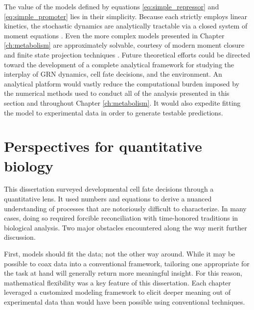 The value of the models defined by equations \ref{eq:simple_repressor} and \ref{eq:simple_promoter} lies in their simplicity. Because each strictly employs linear kinetics, the stochastic dynamics are analytically tractable via a closed system of moment equations \cite{Sotiropoulos2011}. Even the more complex models presented in Chapter \ref{ch:metabolism} are approximately solvable, courtesy of modern moment closure and finite state projection techniques \cite{Singh2011,Munsky2006}. Future theoretical efforts could be directed toward the development of a complete analytical framework for studying the interplay of GRN dynamics, cell fate decisions, and the environment. An analytical platform would vastly reduce the computational burden imposed by the numerical methods used to conduct all of the analysis presented in this section and throughout Chapter \ref{ch:metabolism}. It would also expedite fitting the model to experimental data in order to generate testable predictions. 

\section{Perspectives for quantitative biology}

This dissertation surveyed developmental cell fate decisions through a quantitative lens. It used numbers and equations to derive a nuanced understanding of processes that are notoriously difficult to characterize. In many cases, doing so required forcible reconciliation with time-honored traditions in biological analysis. Two major obstacles encountered along the way merit further discussion.

First, models should fit the data; not the other way around. While it may be possible to coax data into a conventional framework, tailoring one appropriate for the task at hand will generally return more meaningful insight. For this reason, mathematical flexibility was a key feature of this dissertation. Each chapter leveraged a customized modeling framework to elicit deeper meaning out of experimental data than would have been possible using conventional techniques. 

